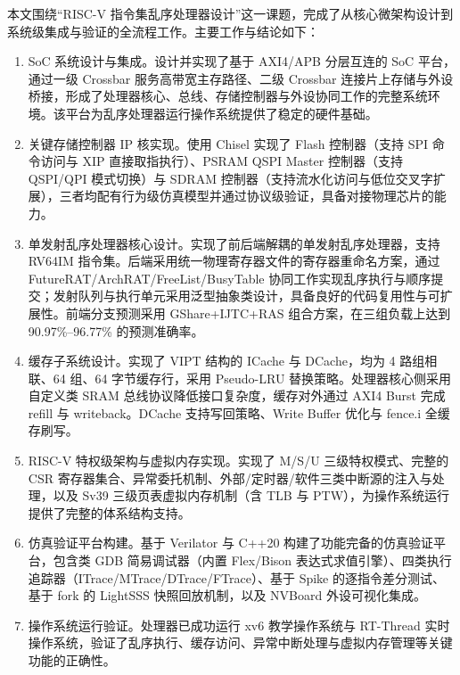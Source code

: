 \begin{conclusions}

本文围绕“RISC-V 指令集乱序处理器设计”这一课题，完成了从核心微架构设计到系统级集成与验证的全流程工作。主要工作与结论如下：

\begin{enumerate}
  \item SoC 系统设计与集成。设计并实现了基于 AXI4/APB 分层互连的 SoC 平台，通过一级 Crossbar 服务高带宽主存路径、二级 Crossbar 连接片上存储与外设桥接，形成了处理器核心、总线、存储控制器与外设协同工作的完整系统环境。该平台为乱序处理器运行操作系统提供了稳定的硬件基础。

  \item 关键存储控制器 IP 核实现。使用 Chisel 实现了 Flash 控制器（支持 SPI 命令访问与 XIP 直接取指执行）、PSRAM QSPI Master 控制器（支持 QSPI/QPI 模式切换）与 SDRAM 控制器（支持流水化访问与低位交叉字扩展），三者均配有行为级仿真模型并通过协议级验证，具备对接物理芯片的能力。

  \item 单发射乱序处理器核心设计。实现了前后端解耦的单发射乱序处理器，支持 RV64IM 指令集。后端采用统一物理寄存器文件的寄存器重命名方案，通过 FutureRAT/ArchRAT/FreeList/BusyTable 协同工作实现乱序执行与顺序提交；发射队列与执行单元采用泛型抽象类设计，具备良好的代码复用性与可扩展性。前端分支预测采用 GShare+IJTC+RAS 组合方案，在三组负载上达到 90.97\%--96.77\% 的预测准确率。

  \item 缓存子系统设计。实现了 VIPT 结构的 ICache 与 DCache，均为 4 路组相联、64 组、64 字节缓存行，采用 Pseudo-LRU 替换策略。处理器核心侧采用自定义类 SRAM 总线协议降低接口复杂度，缓存对外通过 AXI4 Burst 完成 refill 与 writeback。DCache 支持写回策略、Write Buffer 优化与 fence.i 全缓存刷写。

  \item RISC-V 特权级架构与虚拟内存实现。实现了 M/S/U 三级特权模式、完整的 CSR 寄存器集合、异常委托机制、外部/定时器/软件三类中断源的注入与处理，以及 Sv39 三级页表虚拟内存机制（含 TLB 与 PTW），为操作系统运行提供了完整的体系结构支持。

  \item 仿真验证平台构建。基于 Verilator 与 C++20 构建了功能完备的仿真验证平台，包含类 GDB 简易调试器（内置 Flex/Bison 表达式求值引擎）、四类执行追踪器（ITrace/MTrace/DTrace/FTrace）、基于 Spike 的逐指令差分测试、基于 fork 的 LightSSS 快照回放机制，以及 NVBoard 外设可视化集成。

  \item 操作系统运行验证。处理器已成功运行 xv6 教学操作系统与 RT-Thread 实时操作系统，验证了乱序执行、缓存访问、异常中断处理与虚拟内存管理等关键功能的正确性。


\end{enumerate}
\end{conclusions}
